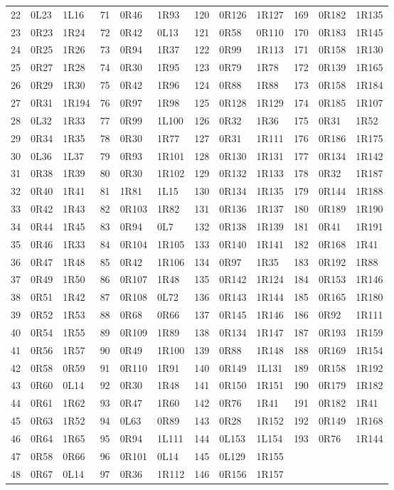 \begin{longtable}{@{}rll@{\hspace{0.9em}}rll@{\hspace{0.9em}}rll@{\hspace{0.9em}}rll@{}}
22&0L23&1L16&71&0R46&1R93&120&0R126&1R127&169&0R182&1R135\\
23&0R23&1R24&72&0R42&0L13&121&0R58&0R110&170&0R183&1R145\\
24&0R25&1R26&73&0R94&1R37&122&0R99&1R113&171&0R158&1R130\\
25&0R27&1R28&74&0R30&1R95&123&0R79&1R78&172&0R139&1R165\\
26&0R29&1R30&75&0R42&1R96&124&0R88&1R88&173&0R158&1R184\\
27&0R31&1R194&76&0R97&1R98&125&0R128&1R129&174&0R185&1R107\\
28&0L32&1R33&77&0R99&1L100&126&0R32&1R36&175&0R31&1R52\\
29&0R34&1R35&78&0R30&1R77&127&0R31&1R111&176&0R186&1R175\\
30&0L36&1L37&79&0R93&1R101&128&0R130&1R131&177&0R134&1R142\\
31&0R38&1R39&80&0R30&1R102&129&0R132&1R133&178&0R32&1R187\\
32&0R40&1R41&81&1R81&1L15&130&0R134&1R135&179&0R144&1R188\\
33&0R42&1R43&82&0R103&1R82&131&0R136&1R137&180&0R189&1R190\\
34&0R44&1R45&83&0R94&0L7&132&0R138&1R139&181&0R41&1R191\\
35&0R46&1R33&84&0R104&1R105&133&0R140&1R141&182&0R168&1R41\\
36&0R47&1R48&85&0R42&1R106&134&0R97&1R35&183&0R192&1R88\\
37&0R49&1R50&86&0R107&1R48&135&0R142&1R124&184&0R153&1R146\\
38&0R51&1R42&87&0R108&0L72&136&0R143&1R144&185&0R165&1R180\\
39&0R52&1R53&88&0R68&0R66&137&0R145&1R146&186&0R92&1R111\\
40&0R54&1R55&89&0R109&1R89&138&0R134&1R147&187&0R193&1R159\\
41&0R56&1R57&90&0R49&1R100&139&0R88&1R148&188&0R169&1R154\\
42&0R58&0R59&91&0R110&1R91&140&0R149&1L131&189&0R158&1R192\\
43&0R60&0L14&92&0R30&1R48&141&0R150&1R151&190&0R179&1R182\\
44&0R61&1R62&93&0R47&1R60&142&0R76&1R41&191&0R182&1R41\\
45&0R63&1R52&94&0L63&0R89&143&0R28&1R152&192&0R149&1R168\\
46&0R64&1R65&95&0R94&1L111&144&0L153&1L154&193&0R76&1R144\\
47&0R58&0R66&96&0R101&0L14&145&0L129&1R155&&&\\
48&0R67&0L14&97&0R36&1R112&146&0R156&1R157&&&\\
\end{longtable}
\endgroup
